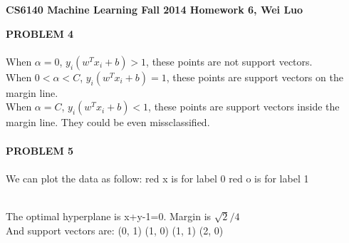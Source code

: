 \documentclass[11pt,a4paper,fleqn]{article}
\begin{document}
\begin{center}
\textbf{CS6140 Machine Learning Fall 2014 Homework 6, Wei Luo }\\
\end{center}
\textbf{PROBLEM 4}\\
\\
When $\alpha=0$, $y_i(w^Tx_i+b) > 1$, these points are not support vectors.\\
When $0 < \alpha < C$, $y_i(w^Tx_i+b) = 1$, these points are support vectors on the margin line.\\
When $\alpha = C$, $y_i(w^Tx_i+b) < 1$, these points are support vectors inside the margin line. They could be even missclassified.\\
\\ \noindent
\textbf{PROBLEM 5}\\
\\
We can plot the data as follow: red x is for label 0 red o is for label 1\\
\\
The optimal hyperplane is x+y-1=0. Margin is $\sqrt{2}/4$\\
And support vectors are: (0, 1) (1, 0) (1, 1) (2, 0)\\
\end{document}
